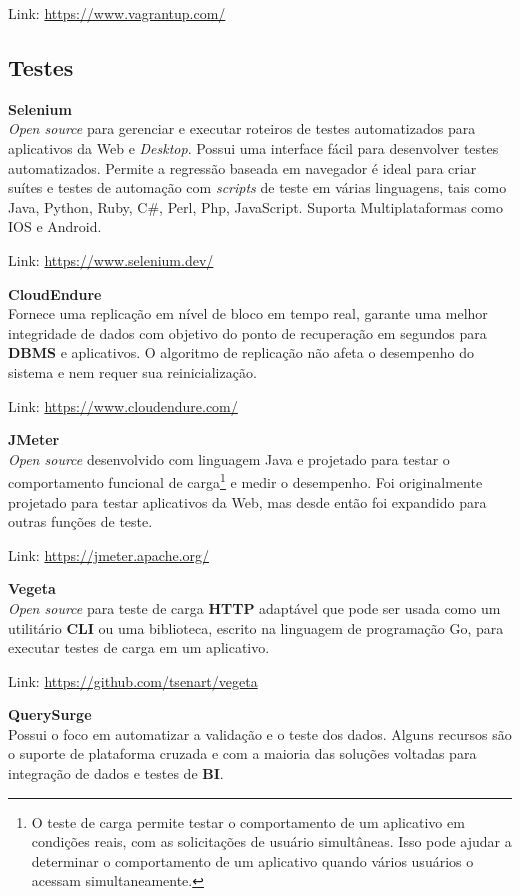 \documentclass[fleqn,10pt]{SelfArx} %
\begin{document}
Link: \url{https://www.vagrantup.com/}

\subsection*{Testes}

\textbf{Selenium} \\
\textit{Open source} para gerenciar e executar roteiros de testes automatizados para aplicativos da Web e \textit{Desktop}. Possui uma interface fácil para desenvolver testes automatizados. Permite a regressão baseada em navegador é ideal para criar suítes e testes de automação com \textit{scripts} de teste em várias linguagens, tais como Java, Python, Ruby, C\#, Perl, Php, JavaScript. Suporta Multiplataformas como IOS e Android.

Link: \url{https://www.selenium.dev/}

\textbf{CloudEndure} \\
Fornece uma replicação em nível de bloco em tempo real, garante uma melhor integridade de dados com objetivo do ponto de recuperação em segundos para \textbf{DBMS} e aplicativos. O algoritmo de replicação não afeta o desempenho do sistema e nem requer sua reinicialização.

Link: \url{https://www.cloudendure.com/}

\textbf{JMeter} \\
\textit{Open source} desenvolvido com linguagem Java e projetado para testar o comportamento funcional de carga\footnote{O teste de carga permite testar o comportamento de um aplicativo em condições reais, com as solicitações de usuário simultâneas. Isso pode ajudar a determinar o comportamento de um aplicativo quando vários usuários o acessam simultaneamente.} e medir o desempenho. Foi originalmente projetado para testar aplicativos da Web, mas desde então foi expandido para outras funções de teste.

Link: \url{https://jmeter.apache.org/}

\textbf{Vegeta} \\
\textit{Open source} para teste de carga \textbf{HTTP} adaptável que pode ser usada como um utilitário \textbf{CLI} ou uma biblioteca,  escrito na linguagem de programação Go, para executar testes de carga em um aplicativo.

Link: \url{https://github.com/tsenart/vegeta}

\textbf{QuerySurge} \\
Possui o foco em automatizar a validação e o teste dos dados. Alguns recursos são o suporte de plataforma cruzada e com a maioria das soluções voltadas para integração de dados e testes de \textbf{BI}.
\end{document}
